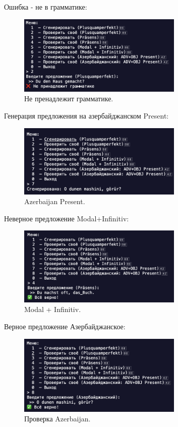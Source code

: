 \documentclass[areasetadvanced]{scrartcl}
\begin{document}
Ошибка - не в грамматике:
\begin{figure}[H]
	\centering
	\includegraphics[width=0.7\textwidth]{images/NotInGrammar.png}
	\caption{Не пренадлежит грамматике.}
	\label{fig:syntdiag}
\end{figure}

Генерация предложения на азербайджанском Present:
\begin{figure}[H]
	\centering
	\includegraphics[width=0.7\textwidth]{images/Azer.png}
	\caption{Azerbaijan Present.}
	\label{fig:syntdiag}
\end{figure}

Неверное предложение Modal+Infinitiv:
\begin{figure}[H]
	\centering
	\includegraphics[width=0.7\textwidth]{images/CheckModalRigth.png}
	\caption{Modal + Infinitiv.}
	\label{fig:syntdiag}
\end{figure}

Верное предложение Азербайджанское:
\begin{figure}[H]
	\centering
	\includegraphics[width=0.7\textwidth]{images/AzerCorrext.png}
	\caption{Проверка Azerbaijan.}
	\label{fig:syntdiag}
\end{figure}
\end{document}
